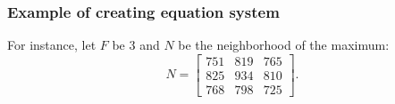 \subsubsection{Example of creating equation system}

For instance, let $F$ be 3 and $N$ be the neighborhood of the maximum:
\[
N =
\begin{bmatrix}
751 & 819 & 765 \\
825 & 934 & 810 \\
768 & 798 & 725
\end{bmatrix}.
\]

